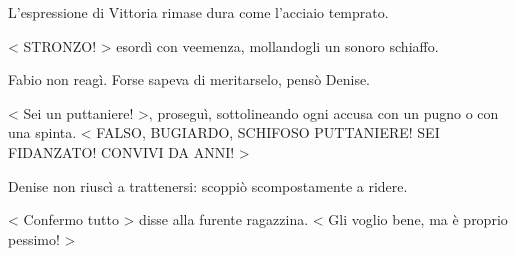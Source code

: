 L'espressione di Vittoria rimase dura come l'acciaio temprato.

< STRONZO! > esordì con veemenza, mollandogli un sonoro schiaffo.

Fabio non reagì. Forse sapeva di meritarselo, pensò Denise.

< Sei un puttaniere! >, proseguì, sottolineando ogni accusa con un pugno o con una spinta. < FALSO, BUGIARDO, SCHIFOSO PUTTANIERE! SEI FIDANZATO! CONVIVI DA ANNI! >

Denise non riuscì a trattenersi: scoppiò scompostamente a ridere.

< Confermo tutto > disse alla furente ragazzina. < Gli voglio bene, ma è proprio pessimo! >

